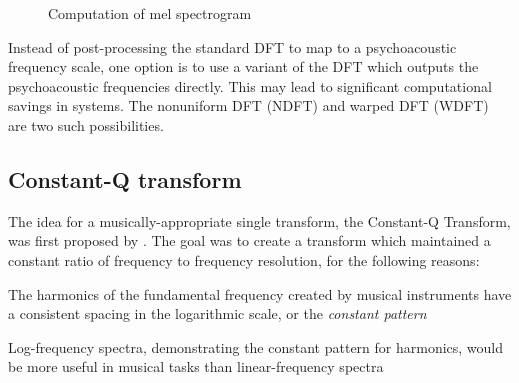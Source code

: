 \documentclass[letter,12pt,notitlepage]{article}
\newenvironment{tight_itemize}{
\begin{itemize}
  \setlength{\itemsep}{0pt}
  \setlength{\parskip}{0pt}
}{\end{itemize}}
\begin{document}

\begin{figure}[ht]
	\centering
	\caption{Computation of mel spectrogram}
	\label{fig:melfilter}
\end{figure}

Instead of post-processing the standard DFT to map to a psychoacoustic frequency scale, one option is to use a variant of the DFT which outputs the psychoacoustic frequencies directly. This may lead to significant computational savings in systems. The nonuniform DFT (NDFT) and warped DFT (WDFT) are two such possibilities.

\subsection{Constant-Q transform}

The idea for a musically-appropriate single transform, the Constant-Q Transform, was first proposed by \citet{jbrown}. The goal was to create a transform which maintained a constant ratio of frequency to frequency resolution, for the following reasons:

\begin{tight_itemize}
	\item
		The harmonics of the fundamental frequency created by musical instruments have a consistent spacing in the logarithmic scale, or the \textit{constant pattern}
	\item
		Log-frequency spectra, demonstrating the constant pattern for harmonics, would be more useful in musical tasks than linear-frequency spectra
\end{tight_itemize}
\end{document}
